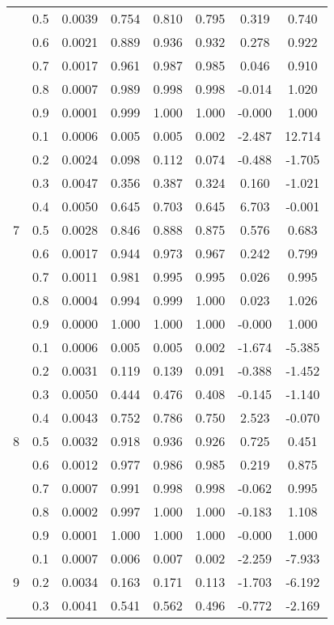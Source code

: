 \documentclass[11pt,a4paper]{report}
\begin{document}
\begin{longtable}{ | c | c || c | c | c | c | c | c | }
 & 0.5 & 0.0039 & 0.754 & 0.810 & 0.795 & 0.319 & 0.740 \\
 & 0.6 & 0.0021 & 0.889 & 0.936 & 0.932 & 0.278 & 0.922 \\
 & 0.7 & 0.0017 & 0.961 & 0.987 & 0.985 & 0.046 & 0.910 \\
 & 0.8 & 0.0007 & 0.989 & 0.998 & 0.998 & -0.014 & 1.020 \\
 & 0.9 & 0.0001 & 0.999 & 1.000 & 1.000 & -0.000 & 1.000 \\
 \hline
\multirow{9}{*}{7} & 0.1 & 0.0006 & 0.005 & 0.005 & 0.002 & -2.487 & 12.714 \\
 & 0.2 & 0.0024 & 0.098 & 0.112 & 0.074 & -0.488 & -1.705 \\
 & 0.3 & 0.0047 & 0.356 & 0.387 & 0.324 & 0.160 & -1.021 \\
 & 0.4 & 0.0050 & 0.645 & 0.703 & 0.645 & 6.703 & -0.001 \\
 & 0.5 & 0.0028 & 0.846 & 0.888 & 0.875 & 0.576 & 0.683 \\
 & 0.6 & 0.0017 & 0.944 & 0.973 & 0.967 & 0.242 & 0.799 \\
 & 0.7 & 0.0011 & 0.981 & 0.995 & 0.995 & 0.026 & 0.995 \\
 & 0.8 & 0.0004 & 0.994 & 0.999 & 1.000 & 0.023 & 1.026 \\
 & 0.9 & 0.0000 & 1.000 & 1.000 & 1.000 & -0.000 & 1.000 \\
 \hline
\multirow{9}{*}{8} & 0.1 & 0.0006 & 0.005 & 0.005 & 0.002 & -1.674 & -5.385 \\
 & 0.2 & 0.0031 & 0.119 & 0.139 & 0.091 & -0.388 & -1.452 \\
 & 0.3 & 0.0050 & 0.444 & 0.476 & 0.408 & -0.145 & -1.140 \\
 & 0.4 & 0.0043 & 0.752 & 0.786 & 0.750 & 2.523 & -0.070 \\
 & 0.5 & 0.0032 & 0.918 & 0.936 & 0.926 & 0.725 & 0.451 \\
 & 0.6 & 0.0012 & 0.977 & 0.986 & 0.985 & 0.219 & 0.875 \\
 & 0.7 & 0.0007 & 0.991 & 0.998 & 0.998 & -0.062 & 0.995 \\
 & 0.8 & 0.0002 & 0.997 & 1.000 & 1.000 & -0.183 & 1.108 \\
 & 0.9 & 0.0001 & 1.000 & 1.000 & 1.000 & -0.000 & 1.000 \\
 \hline
\multirow{9}{*}{9} & 0.1 & 0.0007 & 0.006 & 0.007 & 0.002 & -2.259 & -7.933 \\
 & 0.2 & 0.0034 & 0.163 & 0.171 & 0.113 & -1.703 & -6.192 \\
 & 0.3 & 0.0041 & 0.541 & 0.562 & 0.496 & -0.772 & -2.169 \\

\end{longtable}
\end{document}
